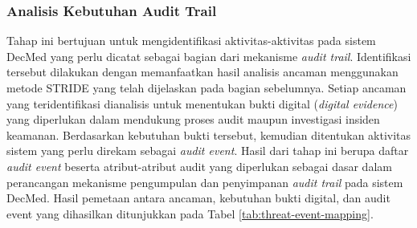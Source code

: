 \subsubsection{Analisis Kebutuhan Audit Trail}

Tahap ini bertujuan untuk mengidentifikasi aktivitas-aktivitas pada sistem DecMed yang perlu dicatat sebagai bagian dari mekanisme \textit{audit trail}. Identifikasi tersebut dilakukan dengan memanfaatkan hasil analisis ancaman menggunakan metode STRIDE yang telah dijelaskan pada bagian sebelumnya. Setiap ancaman yang teridentifikasi dianalisis untuk menentukan bukti digital (\textit{digital evidence}) yang diperlukan dalam mendukung proses audit maupun investigasi insiden keamanan. Berdasarkan kebutuhan bukti tersebut, kemudian ditentukan aktivitas sistem yang perlu direkam sebagai \textit{audit event}. Hasil dari tahap ini berupa daftar \textit{audit event} beserta atribut-atribut audit yang diperlukan sebagai dasar dalam perancangan mekanisme pengumpulan dan penyimpanan \textit{audit trail} pada sistem DecMed. Hasil pemetaan antara ancaman, kebutuhan bukti digital, dan audit event yang dihasilkan ditunjukkan pada Tabel \ref{tab:threat-event-mapping}.

